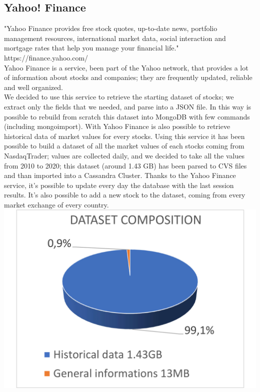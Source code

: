 \subsection{Yahoo! Finance}
"Yahoo Finance provides free stock quotes, up-to-date news, portfolio management resources, 
international market data, social interaction and mortgage rates that help you manage your 
financial life." https://finance.yahoo.com/ \\
Yahoo Finance is a service, been part of the Yahoo network, that provides a lot of information
about stocks and companies; they are frequently updated, reliable and well organized.\\
We decided to use this service to retrieve the starting dataset of stocks; we extract only 
the fields that we needed, and parse into a JSON file. In this way 
is possible to rebuild from scratch this dataset into MongoDB with few commands (including
mongoimport).
With Yahoo Finance is also possible to retrieve historical data of market values for every 
stocks. Using this service it has been possible to build a dataset of all the market values of
each stocks coming from NasdaqTrader; values are collected daily, and we decided to take all 
the values from 2010 to 2020; this dataset (around 1.43 GB) has been parsed to CVS files and
than imported into a Cassandra Cluster. Thanks to the Yahoo Finance service, it's possible
to update every day the database with the last session results. It's also possible to add a new
stock to the dataset, coming from every market exchange of every country.\\
\includegraphics[scale=0.12]{img/dataset_comp.png}\\


